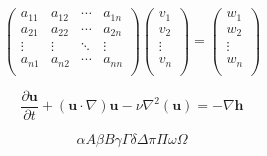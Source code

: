 \documentclass[a4paper]{article}
\begin{document}
\[
\begin{pmatrix}
a_{11} & a_{12} & \cdots & a_{1n}\\
a_{21} & a_{22} & \cdots & a_{2n}\\
\vdots & \vdots & \ddots & \vdots \\
a_{n1} & a_{n2} & \cdots & a_{nn}\\
\end{pmatrix}
\begin{pmatrix}
v_{1}\\
v_{2}\\
\vdots \\
v_{n}\\
\end{pmatrix}
=
\begin{pmatrix}
w_{1} \\
w_{2} \\
\vdots \\
w_{n} \\
\end{pmatrix}
\]

\begin{equation}
\frac{\partial \textbf{u}}{\partial t} + (\textbf{u} \cdot\nabla)\textbf{u} - \nu \nabla^2 (\textbf{u}) = -\nabla \textbf{h}
\end{equation}

$$ \alpha A \beta B \gamma \Gamma \delta \Delta \pi \Pi \omega \Omega $$
\end{document}
